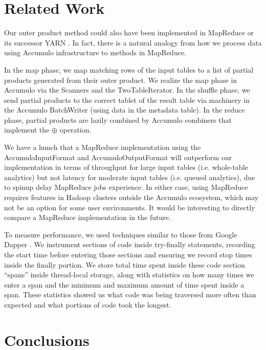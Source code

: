 \section{Related Work} %
Our outer product method could also have been implemented in MapReduce \cite{x} or its successor YARN \cite{x}.
In fact, there is a natural analogy from
how we process data using Accumulo infrastructure to methods in MapReduce.

In the map phase, we map matching rows of the input tables to a list
of partial products generated from their outer product.
We realize the map phase in Accumulo via the Scanners and the TwoTableIterator.
In the shuffle phase, we send partial products to the correct tablet of the result
table via machinery in the Accumulo BatchWriter (using data in the metadata table).
In the reduce phase, partial products are lazily combined by Accumulo combiners 
that implement the $\oplus$ operation.

We have a hunch that a MapReduce implementation using the AccumuloInputFormat and AccumuloOutputFormat 
will outperform our implementation in terms of throughput for large input tables (i.e. whole-table analytics)
but not latency for moderate input tables (i.e. queued analytics), due to spinup delay MapReduce jobs experience.
In either case, using MapReduce requires features in Hadoop clusters outside the 
Accumulo ecosystem, which may not be an option for some user environments.
It would be interesting to directly compare a MapReduce implementation in the future.



To measure performance, we used techniques similar to those from Google Dapper \cite{x}.
We instrument sections of code inside try-finally statements, recording the start time before 
entering those sections and ensuring we record stop times inside the finally portion.
We store total time spent inside these code section ``spans'' inside thread-local storage,
along with statistics on how many times we enter a span and the minimum and maximum amount of time
spent inside a span. These statistics showed us what code was being traversed more often than expected
and what portions of code took the longest. 

\section{Conclusions}
\label{sConclusions}

